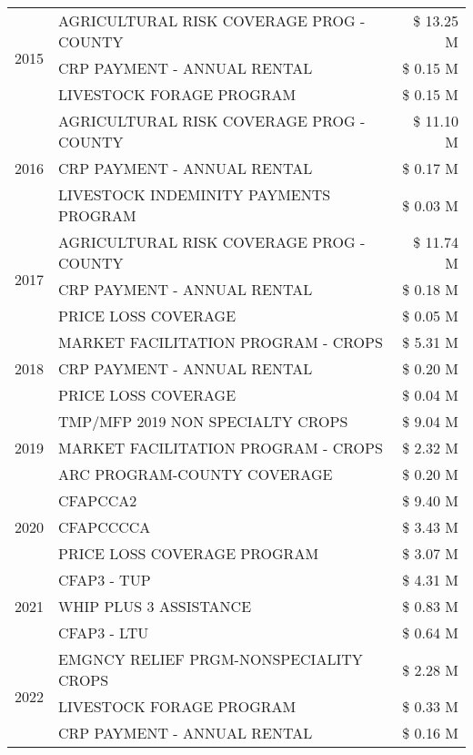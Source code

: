\begin{tabular}{llr}
\multirow[t]{3}{*}{2015} & AGRICULTURAL RISK COVERAGE PROG - COUNTY & \$ 13.25 M \\
 & CRP PAYMENT - ANNUAL RENTAL & \$ 0.15 M \\
 & LIVESTOCK FORAGE PROGRAM & \$ 0.15 M \\
\cline{1-3}
\multirow[t]{3}{*}{2016} & AGRICULTURAL RISK COVERAGE PROG - COUNTY & \$ 11.10 M \\
 & CRP PAYMENT - ANNUAL RENTAL & \$ 0.17 M \\
 & LIVESTOCK INDEMINITY PAYMENTS PROGRAM & \$ 0.03 M \\
\cline{1-3}
\multirow[t]{3}{*}{2017} & AGRICULTURAL RISK COVERAGE PROG - COUNTY & \$ 11.74 M \\
 & CRP PAYMENT - ANNUAL RENTAL & \$ 0.18 M \\
 & PRICE LOSS COVERAGE & \$ 0.05 M \\
\cline{1-3}
\multirow[t]{3}{*}{2018} & MARKET FACILITATION PROGRAM - CROPS & \$ 5.31 M \\
 & CRP PAYMENT - ANNUAL RENTAL & \$ 0.20 M \\
 & PRICE LOSS COVERAGE & \$ 0.04 M \\
\cline{1-3}
\multirow[t]{3}{*}{2019} & TMP/MFP 2019 NON SPECIALTY CROPS & \$ 9.04 M \\
 & MARKET FACILITATION PROGRAM - CROPS & \$ 2.32 M \\
 & ARC PROGRAM-COUNTY COVERAGE & \$ 0.20 M \\
\cline{1-3}
\multirow[t]{3}{*}{2020} & CFAPCCA2 & \$ 9.40 M \\
 & CFAPCCCCA & \$ 3.43 M \\
 & PRICE LOSS COVERAGE PROGRAM & \$ 3.07 M \\
\cline{1-3}
\multirow[t]{3}{*}{2021} & CFAP3 - TUP & \$ 4.31 M \\
 & WHIP PLUS 3 ASSISTANCE & \$ 0.83 M \\
 & CFAP3 - LTU & \$ 0.64 M \\
\cline{1-3}
\multirow[t]{3}{*}{2022} & EMGNCY RELIEF PRGM-NONSPECIALITY CROPS & \$ 2.28 M \\
 & LIVESTOCK FORAGE PROGRAM & \$ 0.33 M \\
 & CRP PAYMENT - ANNUAL RENTAL & \$ 0.16 M \\
\cline{1-3}
\bottomrule
\end{tabular}
